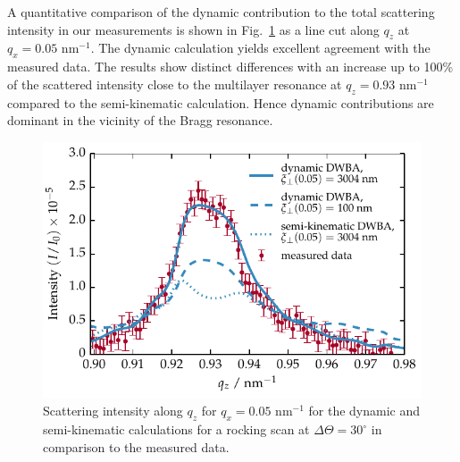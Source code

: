 A quantitative comparison of the dynamic contribution to the total scattering intensity in our measurements is shown in Fig.~\ref{fig:Comparison_full_semi} as a line cut along $q_z$ at $q_x=0.05$ nm$^{-1}$. The dynamic calculation yields excellent agreement with the measured data. The results show distinct differences with an increase up to 100\% of the scattered intensity close to the multilayer resonance at $q_z=0.93$ nm$^{-1}$ compared to the semi-kinematic calculation. Hence dynamic contributions are dominant in the vicinity of the Bragg resonance. 
\begin{figure}[htbp]
        \includegraphics{img/PTB17_diffuse_qz_kinematic_vs_dynamic_100nm} \caption{Scattering intensity along $q_z$ for $q_x=0.05$ nm$^{-1}$ for the dynamic and semi-kinematic calculations for a rocking scan at $\Delta\Theta=30^\circ$ in comparison to the measured data.} \label{fig:Comparison_full_semi} 
\end{figure}

